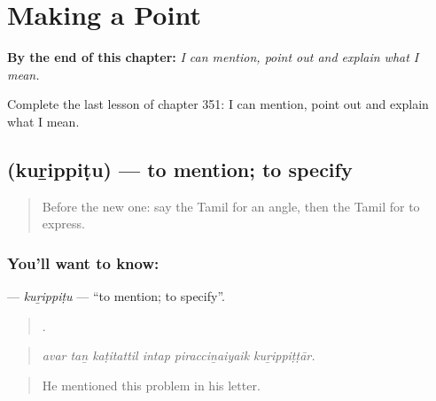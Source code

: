 
\chapter{Making a Point}
\label{ch:ta-making-a-point}

\begin{chapteropening}
\textbf{By the end of this chapter:} \emph{I can mention, point out and explain what I mean.}

Complete the last lesson of chapter 351: I can mention, point out and explain what I mean.
\end{chapteropening}

\section[\texorpdfstring{\ta{குறிப்பிடு} (kuṟippiṭu)}{குறிப்பிடு (kuṟippiṭu)}]{ (kuṟippiṭu) — to mention; to specify}

\label{lesson:TA-C351-kurippitu}



\begin{quote}
Before the new one: say the Tamil for an angle, then the Tamil for to express.
\end{quote}

\subsection*{You'll want to know: }
\textbf{} — \emph{kuṟippiṭu} — \textquotedblleft{}to mention; to specify\textquotedblright{}.

\begin{quote}
     .
\end{quote}

\begin{quote}
\emph{avar taṉ kaṭitattil intap piracciṉaiyaik kuṟippiṭṭār.}
\end{quote}

\begin{quote}
He mentioned this problem in his letter.
\end{quote}


